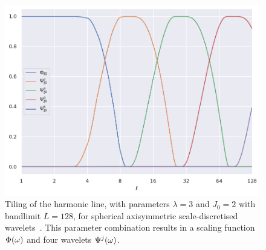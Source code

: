 \begin{figure}[htpb]
	\centering\capstart{}
	\includegraphics[width=\textwidth]{axisymmetric_tiling_L128.pdf}
	\caption[
		Tiling of the harmonic line used in scale-discretised wavelets
	]{
		Tiling of the harmonic line, with parameters \(\lambda=3\) and \(J_{0}=2\) with bandlimit \(L=128\), for spherical axisymmetric scale-discretised wavelets~\cite{Wiaux2008,McEwen2018,Leistedt2013,McEwen2013,McEwen2015}.
		This parameter combination results in a scaling function \(\Phi(\omega)\) and four wavelets \(\Psi^{j}(\omega)\).
	}\label{fig:chapter2_tiling}
\end{figure}
